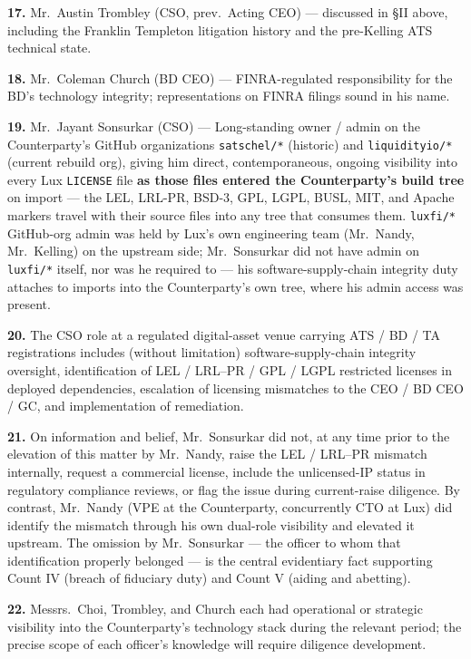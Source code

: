 \documentclass[11pt,letterpaper]{article}
\begin{document}
\textbf{17.} Mr.\ Austin Trombley (CSO, prev.\ Acting CEO) ---
discussed in \S II above, including the Franklin Templeton litigation
history and the pre-Kelling ATS technical state.

\textbf{18.} Mr.\ Coleman Church (BD CEO) --- FINRA-regulated
responsibility for the BD's technology integrity; representations on
FINRA filings sound in his name.

\textbf{19.} Mr.\ Jayant Sonsurkar (CSO) --- Long-standing owner /
admin on the Counterparty's GitHub organizations \texttt{satschel/*}
(historic) and \texttt{liquidityio/*} (current rebuild org), giving
him direct, contemporaneous, ongoing visibility into every Lux
\texttt{LICENSE} file \textbf{as those files entered the
Counterparty's build tree} on import --- the LEL, LRL-PR, BSD-3,
GPL, LGPL, BUSL, MIT, and Apache markers travel with their source
files into any tree that consumes them. \texttt{luxfi/*} GitHub-org
admin was held by Lux's own engineering team (Mr.\ Nandy, Mr.\ Kelling)
on the upstream side; Mr.\ Sonsurkar did not have admin on
\texttt{luxfi/*} itself, nor was he required to --- his
software-supply-chain integrity duty attaches to imports into the
Counterparty's own tree, where his admin access was present.

\textbf{20.} The CSO role at a regulated digital-asset venue
carrying ATS / BD / TA registrations includes (without limitation)
software-supply-chain integrity oversight, identification of LEL /
LRL--PR / GPL / LGPL restricted licenses in deployed dependencies,
escalation of licensing mismatches to the CEO / BD CEO / GC, and
implementation of remediation.

\textbf{21.} On information and belief, Mr.\ Sonsurkar did not, at
any time prior to the elevation of this matter by Mr.\ Nandy, raise the
LEL / LRL--PR mismatch internally, request a commercial license,
include the unlicensed-IP status in regulatory compliance reviews, or
flag the issue during current-raise diligence. By contrast, Mr.\ Nandy
(VPE at the Counterparty, concurrently CTO at Lux) did identify the
mismatch through his own dual-role visibility and elevated it
upstream. The omission by Mr.\ Sonsurkar --- the officer to whom that
identification properly belonged --- is the central evidentiary fact
supporting Count IV (breach of fiduciary duty) and Count V (aiding
and abetting).

\textbf{22.} Messrs.\ Choi, Trombley, and Church each had operational
or strategic visibility into the Counterparty's technology stack
during the relevant period; the precise scope of each officer's
knowledge will require diligence development.
\end{document}
